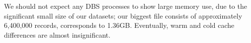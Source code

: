 We should not expect any DBS processes to show large memory use, due to the significant small size of our datasets;
our biggest file consists of approximately 6,400,000 records, corresponds to 1.36GB. Eventually, 
warm and cold cache differences are almost insignificant. 


